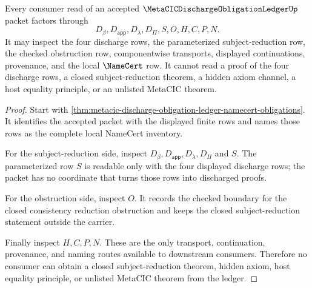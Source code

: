 \begin{theorem}
\label{thm:metacic-discharge-obligation-ledger-nonescape}
Every consumer read of an accepted $\MetaCICDischargeObligationLedgerUp$ packet factors through
$$
D_\beta,D_{\mathsf{app}},D_\lambda,D_\Pi,S,O,H,C,P,N.
$$
It may inspect the four discharge rows, the parameterized subject-reduction row, the checked obstruction row, componentwise transports, displayed continuations, provenance, and the local $\NameCert$ row. It cannot read a proof of the four discharge rows, a closed subject-reduction theorem, a hidden axiom channel, a host equality principle, or an unlisted MetaCIC theorem.
\end{theorem}
\begin{proof}
Start with \autoref{thm:metacic-discharge-obligation-ledger-namecert-obligations}. It identifies the accepted packet with the displayed finite rows and names those rows as the complete local NameCert inventory.

For the subject-reduction side, inspect $D_\beta,D_{\mathsf{app}},D_\lambda,D_\Pi$ and $S$. The parameterized row $S$ is readable only with the four displayed discharge rows; the packet has no coordinate that turns those rows into discharged proofs.

For the obstruction side, inspect $O$. It records the checked boundary for the closed consistency reduction obstruction and keeps the closed subject-reduction statement outside the carrier.

Finally inspect $H,C,P,N$. These are the only transport, continuation, provenance, and naming routes available to downstream consumers. Therefore no consumer can obtain a closed subject-reduction theorem, hidden axiom, host equality principle, or unlisted MetaCIC theorem from the ledger.
\end{proof}


\begin{closurestatus}{\MetaCICDischargeObligationLedgerUp}
  \theoryclosure{\seedClosure}
  \formalstatus{\unformalizedV}
\end{closurestatus}
